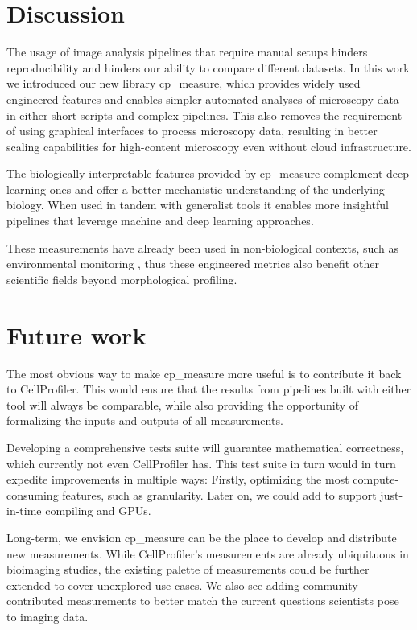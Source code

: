 \documentclass{article}
\begin{document}
\section{Discussion}
\label{sec:orgf37b369}
The usage of image analysis pipelines that require manual setups hinders reproducibility and hinders our ability to compare different datasets. In this work we introduced our new library cp\_measure, which provides widely used engineered features and enables simpler automated analyses of microscopy data in either short scripts and complex pipelines. This also removes the requirement of using graphical interfaces to process microscopy data, resulting in better scaling capabilities for high-content microscopy even without cloud infrastructure.

The biologically interpretable features provided by cp\_measure complement deep learning ones and offer a better mechanistic understanding of the underlying biology. When used in tandem with generalist tools it enables more insightful pipelines that leverage machine and deep learning approaches. 

These measurements have already been used in non-biological contexts, such as environmental monitoring \citep{ideharaExploringNileRed2025}, thus these engineered metrics also benefit other scientific fields beyond morphological profiling.
\section{Future work}
\label{sec:org5cdbb12}
The most obvious way to make cp\_measure more useful is to contribute it back to CellProfiler. This would ensure that the results from pipelines built with either tool will always be comparable, while also providing the opportunity of formalizing the inputs and outputs of all measurements. 

Developing a comprehensive tests suite will guarantee mathematical correctness, which currently not even CellProfiler has. This test suite in turn would in turn expedite improvements in multiple ways: Firstly, optimizing the most compute-consuming features, such as granularity. Later on, we could add to support just-in-time compiling and GPUs.

Long-term, we envision cp\_measure can be the place to develop and distribute new measurements. While CellProfiler's measurements are already ubiquituous in bioimaging studies, the existing palette of measurements could be further extended to cover unexplored use-cases. We also see adding community-contributed measurements to better match the current questions scientists pose to imaging data.



\end{document}
